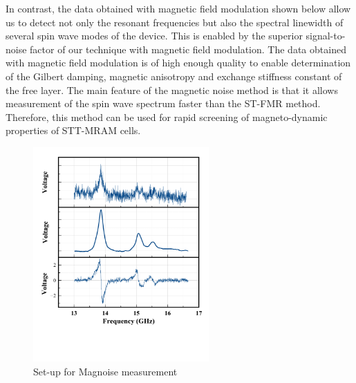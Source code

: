 In contrast, the data obtained with magnetic field modulation shown below allow us to detect not only the resonant frequencies but also the spectral linewidth of several spin wave modes of the device. This is enabled by the superior signal-to-noise factor of our technique with magnetic field modulation. The data obtained with magnetic field modulation is of high enough quality to enable determination of the Gilbert damping, magnetic anisotropy and exchange stiffness constant of the free layer. The main feature of the magnetic noise method is that it allows measurement of the spin wave spectrum faster than the ST-FMR method.  Therefore, this method can be used for rapid screening of magneto-dynamic properties of STT-MRAM cells.




\begin{figure}[!ht]
  \centering
  \includegraphics[width=0.6\textwidth]{fig/magnoise/magnoise-data.png}
   \caption{Set-up for Magnoise measurement}
  \label{fig:magnoisedata}
\end{figure}


